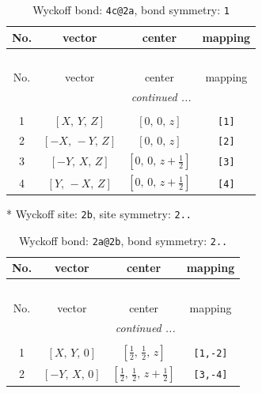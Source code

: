 \documentclass[fleqn,8pt]{jsarticle}
\begin{document}
\renewcommand{\arraystretch}{1.2}
\begin{longtable}{cccc}
\caption{Wyckoff bond: {\tt 4c@2a}, bond symmetry: {\tt 1}}
 \\
 \hline \hline
No. & vector & center & mapping \\ \hline \endfirsthead

\multicolumn{3}{l}{\tablename\ \thetable{}} \\
 \hline \hline
No. & vector & center & mapping \\ \hline \endhead

 \hline \hline
\multicolumn{3}{r}{\footnotesize\it continued ...} \\ \endfoot

 \hline \hline
\multicolumn{3}{r}{} \\ \endlastfoot

1 & $\left[ X,\, Y,\, Z \right]$ & $\left[ 0,\, 0,\, z \right]$ & {\tt [1]} \\ \hline
2 & $\left[ - X,\, - Y,\, Z \right]$ & $\left[ 0,\, 0,\, z \right]$ & {\tt [2]} \\ \hline
3 & $\left[ - Y,\, X,\, Z \right]$ & $\left[ 0,\, 0,\, z + \frac{1}{2} \right]$ & {\tt [3]} \\ \hline
4 & $\left[ Y,\, - X,\, Z \right]$ & $\left[ 0,\, 0,\, z + \frac{1}{2} \right]$ & {\tt [4]} \\
\end{longtable}
* Wyckoff site: {\tt 2b}, site symmetry: {\tt 2..}
\renewcommand{\arraystretch}{1.2}
\begin{longtable}{cccc}
\caption{Wyckoff bond: {\tt 2a@2b}, bond symmetry: {\tt 2..}}
 \\
 \hline \hline
No. & vector & center & mapping \\ \hline \endfirsthead

\multicolumn{3}{l}{\tablename\ \thetable{}} \\
 \hline \hline
No. & vector & center & mapping \\ \hline \endhead

 \hline \hline
\multicolumn{3}{r}{\footnotesize\it continued ...} \\ \endfoot

 \hline \hline
\multicolumn{3}{r}{} \\ \endlastfoot

1 & $\left[ X,\, Y,\, 0 \right]$ & $\left[ \frac{1}{2},\, \frac{1}{2},\, z \right]$ & {\tt [1,-2]} \\ \hline
2 & $\left[ - Y,\, X,\, 0 \right]$ & $\left[ \frac{1}{2},\, \frac{1}{2},\, z + \frac{1}{2} \right]$ & {\tt [3,-4]} \\
\end{longtable}
\end{document}
